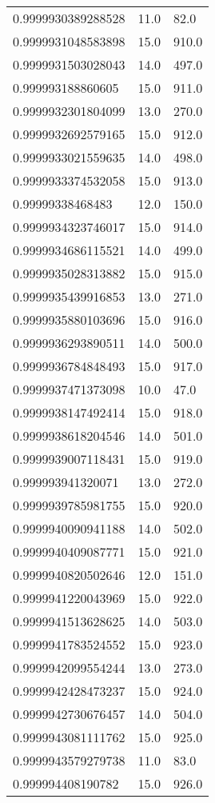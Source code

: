 \begin{center}
\begin{supertabular}[H]{p{0.30\textwidth}p{0.05\textwidth}p{0.05\textwidth}}
0.9999930389288528 & 11.0 & 82.0 \\ 
0.9999931048583898 & 15.0 & 910.0 \\ 
0.9999931503028043 & 14.0 & 497.0 \\ 
0.999993188860605 & 15.0 & 911.0 \\ 
0.9999932301804099 & 13.0 & 270.0 \\ 
0.9999932692579165 & 15.0 & 912.0 \\ 
0.9999933021559635 & 14.0 & 498.0 \\ 
0.9999933374532058 & 15.0 & 913.0 \\ 
0.99999338468483 & 12.0 & 150.0 \\ 
0.9999934323746017 & 15.0 & 914.0 \\ 
0.9999934686115521 & 14.0 & 499.0 \\ 
0.9999935028313882 & 15.0 & 915.0 \\ 
0.9999935439916853 & 13.0 & 271.0 \\ 
0.9999935880103696 & 15.0 & 916.0 \\ 
0.9999936293890511 & 14.0 & 500.0 \\ 
0.9999936784848493 & 15.0 & 917.0 \\ 
0.9999937471373098 & 10.0 & 47.0 \\ 
0.9999938147492414 & 15.0 & 918.0 \\ 
0.9999938618204546 & 14.0 & 501.0 \\ 
0.9999939007118431 & 15.0 & 919.0 \\ 
0.999993941320071 & 13.0 & 272.0 \\ 
0.9999939785981755 & 15.0 & 920.0 \\ 
0.9999940090941188 & 14.0 & 502.0 \\ 
0.9999940409087771 & 15.0 & 921.0 \\ 
0.9999940820502646 & 12.0 & 151.0 \\ 
0.9999941220043969 & 15.0 & 922.0 \\ 
0.9999941513628625 & 14.0 & 503.0 \\ 
0.9999941783524552 & 15.0 & 923.0 \\ 
0.9999942099554244 & 13.0 & 273.0 \\ 
0.9999942428473237 & 15.0 & 924.0 \\ 
0.9999942730676457 & 14.0 & 504.0 \\ 
0.9999943081111762 & 15.0 & 925.0 \\ 
0.9999943579279738 & 11.0 & 83.0 \\ 
0.999994408190782 & 15.0 & 926.0 \\ 

\end{supertabular}
\end{center}
